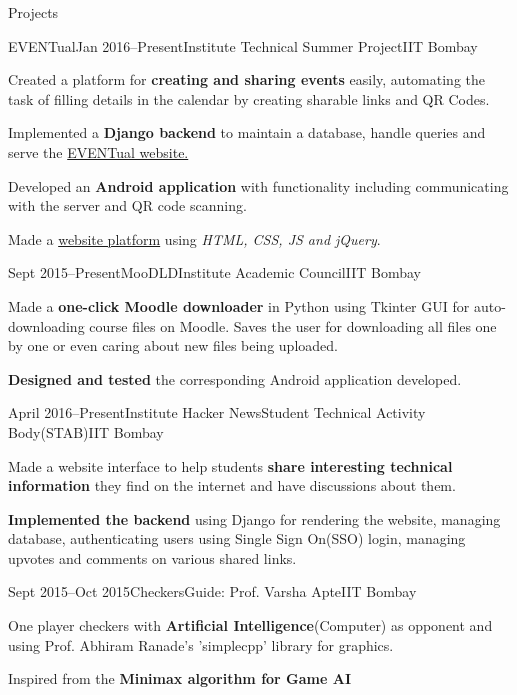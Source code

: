 \documentclass{resume_ssl}
\begin{document}
\begin{Section}{Projects}
\begin{Subsection}{EVENTual}{Jan 2016--Present}{Institute Technical Summer Project}{IIT Bombay}{
\item {Created a platform for \textbf{creating and sharing events} easily, automating the task of filling details in the calendar by creating sharable links and QR Codes.}
\item {Implemented a \textbf{Django backend} to maintain a database, handle queries and serve the
\href{http://www.eventual.co.in}{EVENTual website.}}
\item {Developed an \textbf{Android application} with functionality including communicating with the server and QR code scanning.}
\item {Made a \href{http://www.eventual.co.in}{website platform} using \textit{HTML, CSS, JS and jQuery}.}
}
\end{Subsection}

\pagebreak

\begin{Subsection}{Sept 2015--Present}{MooDLD}{Institute Academic Council}{IIT Bombay}{
\item {Made a \textbf{one-click Moodle downloader} in Python using Tkinter GUI for auto-downloading course files on Moodle. Saves the user for downloading all files one by one or even caring about new files being uploaded.}
\item {\textbf{Designed and tested} the corresponding Android application developed.}
}
\end{Subsection}

\begin{Subsection}{April 2016--Present}{Institute Hacker News}{Student Technical Activity Body(STAB)}{IIT Bombay}{
\item {Made a website interface to help students \textbf{share interesting technical information} they find on the internet and have discussions about them.}
\item {\textbf{Implemented the backend} using Django for rendering the website, managing database, authenticating users using Single Sign On(SSO) login, managing upvotes and comments on various shared links.}
}
\end{Subsection}

\begin{Subsection}{Sept 2015--Oct 2015}{Checkers}{Guide: Prof. Varsha Apte}{IIT Bombay}{
\item {One player checkers with \textbf{Artificial Intelligence}(Computer) as opponent and using Prof. Abhiram Ranade's 'simplecpp' library for graphics.}
\item {Inspired from the \textbf{Minimax algorithm for Game AI}}
}
\end{Subsection}

\end{Section}
\end{document}
